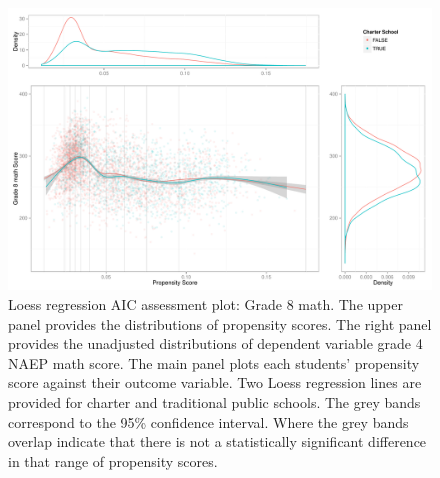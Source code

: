 \begin{figure}[h!]
\begin{center}
\includegraphics{../Figures2009/g8math-loessAIC.pdf}
\caption[Loess regression AIC assessment plot: Grade 8 math]{Loess regression AIC assessment plot: Grade 8 math. The upper panel provides the distributions of propensity scores. The right panel provides the unadjusted distributions of dependent variable grade 4 NAEP math score. The main panel plots each students' propensity score against their outcome variable. Two Loess regression lines are provided for charter and traditional public schools. The grey bands correspond to the 95\% confidence interval. Where the grey bands overlap indicate that there is not a statistically significant difference in that range of propensity scores.}
\label{fig:g8math:loess}
\end{center}
\end{figure}


